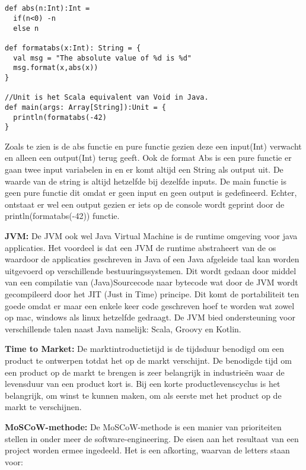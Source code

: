 \begin{lstlisting}[caption={Pure functie met IO},label=lst:pf]


def abs(n:Int):Int =
  if(n<0) -n
  else n

def formatabs(x:Int): String = {
  val msg = "The absolute value of %d is %d"
  msg.format(x,abs(x))
}

//Unit is het Scala equivalent van Void in Java.
def main(args: Array[String]):Unit = {
  println(formatabs(-42)
}
\end{lstlisting}

Zoals te zien is de abs functie en pure functie gezien deze een input(Int) verwacht en alleen een output(Int) terug geeft.
Ook de format Abs is een pure functie er gaan twee input variabelen in en er komt altijd een String als output uit.
De waarde van de string is altijd hetzelfde bij dezelfde inputs.
De main functie is geen pure functie dit omdat er geen input en geen output is gedefineerd.
Echter, ontstaat er wel een output gezien er iets op de console wordt geprint door de println(formatabs(-42)) functie.
\smallskip

\textbf{JVM: }
De JVM ook wel Java Virtual Machine is de runtime omgeving voor java applicaties.
Het voordeel is dat een JVM de runtime abstraheert van de os waardoor de applicaties geschreven in Java of een Java afgeleide taal kan worden uitgevoerd op verschillende bestuuringssystemen.
Dit wordt gedaan door middel van een compilatie van (Java)Sourcecode naar bytecode wat door de JVM wordt gecompileerd door het JIT (Just in Time) principe.
Dit komt de portabiliteit ten goede omdat er maar een enkele keer code geschreven hoef te worden wat zowel op mac, windows als linux hetzelfde gedraagt.
De JVM bied ondersteuning voor verschillende talen naast Java namelijk: Scala, Groovy en Kotlin.
\smallskip

\textbf{Time to Market: }
De marktintroductietijd is de tijdsduur benodigd om een product te ontwerpen totdat het op de markt verschijnt.
De benodigde tijd om een product op de markt te brengen is zeer belangrijk in industrieën waar de levensduur van een product kort is.
Bij een korte productlevenscyclus is het belangrijk, om winst te kunnen maken, om als eerste met het product op de markt te verschijnen.
\smallskip

\textbf{MoSCoW-methode: }
De MoSCoW-methode is een manier van prioriteiten stellen in onder meer de software-engineering.
De eisen aan het resultaat van een project worden ermee ingedeeld.
Het is een afkorting, waarvan de letters staan voor:

